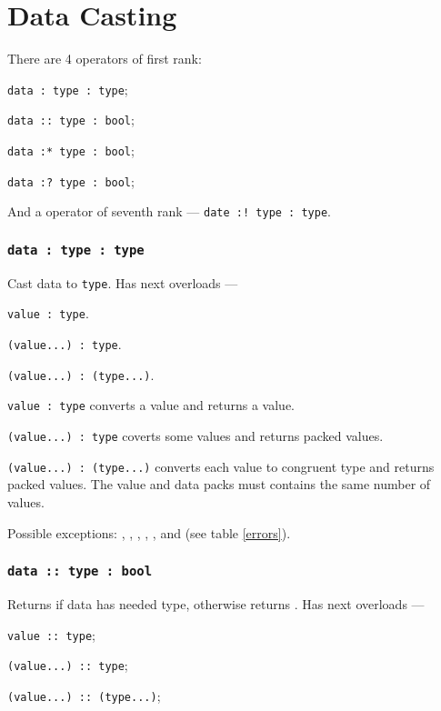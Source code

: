 \section{Data Casting}

There are 4 operators of first rank:
\begin{icItems}
	\item \texttt{data : type : type};
	\item \texttt{data :: type : bool};
	\item \texttt{data :* type : bool};
	\item \texttt{data :? type : bool};
\end{icItems}

And a operator of seventh rank — \texttt{date :! type : type}.

\subsubsection{\texttt{data : type : type}}

Cast data to \texttt{type}. Has next overloads —
\begin{icItems}
	\item \texttt{value : type}.
	\item \texttt{(value...) : type}.
	\item \texttt{(value...) : (type...)}.
\end{icItems}

\texttt{value : type} converts a value and returns a value.

\texttt{(value...) : type} coverts some values and returns packed values.

\texttt{(value...) : (type...)} converts each value to congruent type and returns packed values. The value and data packs must contains the same number of values.

Possible exceptions: , , , , ,  and  (see table \ref{errors}).

\subsubsection{\texttt{data :: type : bool}}

Returns \true{} if data has needed type, otherwise returns \false. Has next overloads —
\begin{icItems}
	\item \texttt{value :: type};
	\item \texttt{(value...) :: type};
	\item \texttt{(value...) :: (type...)};
\end{icItems}


